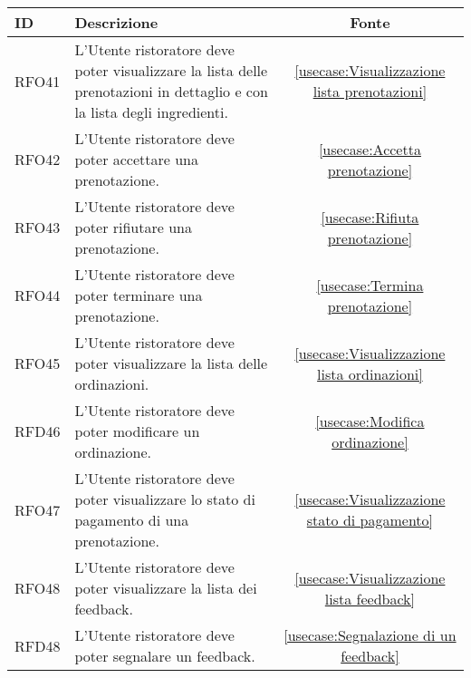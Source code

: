 \begin{table}[H]
	\renewcommand{\arraystretch}{1.5}
	\centering
	\begin{tabularx}{\textwidth}{l|X|c}
		\textbf{ID} & \textbf{Descrizione}                                                                                                    & \textbf{Fonte}                                       \\
		\hline
		RFO41       & L'Utente ristoratore deve poter visualizzare la lista delle prenotazioni in dettaglio e con la lista degli ingredienti. & \autoref{usecase:Visualizzazione lista prenotazioni} \\
		\hline
		RFO42       & L'Utente ristoratore deve poter accettare una prenotazione.                                                             & \autoref{usecase:Accetta prenotazione}               \\
		\hline
		RFO43       & L'Utente ristoratore deve poter rifiutare una prenotazione.                                                             & \autoref{usecase:Rifiuta prenotazione}               \\
		\hline
		RFO44       & L'Utente ristoratore deve poter terminare una prenotazione.                                                             & \autoref{usecase:Termina prenotazione}               \\
		\hline
		RFO45       & L'Utente ristoratore deve poter visualizzare la lista delle ordinazioni.                                                & \autoref{usecase:Visualizzazione lista ordinazioni}  \\
		\hline
		RFD46       & L'Utente ristoratore deve poter modificare un ordinazione.                                                              & \autoref{usecase:Modifica ordinazione}               \\
		\hline
		RFO47       & L'Utente ristoratore deve poter visualizzare lo stato di pagamento di una prenotazione.                                 & \autoref{usecase:Visualizzazione stato di pagamento} \\
		\hline
		RFO48       & L'Utente ristoratore deve poter visualizzare la lista dei feedback.                                                     & \autoref{usecase:Visualizzazione lista feedback}     \\
		\hline
		RFD48       & L'Utente ristoratore deve poter segnalare un feedback.                                                                  & \autoref{usecase:Segnalazione di un feedback}        \\

\end{tabularx}
\end{table}
